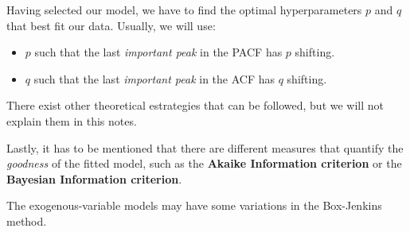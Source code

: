 Having selected our model, we have to find the optimal hyperparameters \(p\) and \(q\) that best fit our data. Usually, we will use:

\begin{itemize}
  \item  \(p\) such that  the last \emph{important peak} in the PACF has \(p\) shifting.
        \item \(q\) such that  the last \emph{important peak} in the ACF  has \(q\) shifting.
\end{itemize}

There exist other theoretical estrategies that can be followed, but we will not explain them in this notes.

Lastly, it has to be mentioned that there are different measures that quantify the \emph{goodness} of the fitted model, such as the \textbf{Akaike Information criterion} or the \textbf{Bayesian Information criterion}.


\begin{note}
The exogenous-variable models may have some variations in the Box-Jenkins method.
\end{note}

